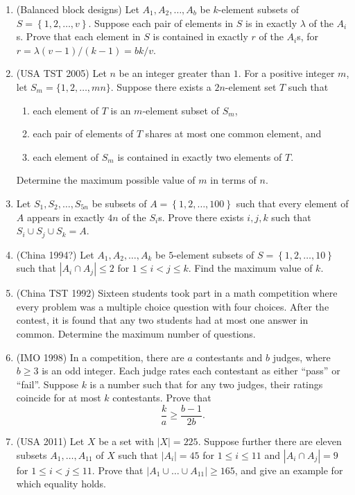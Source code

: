 \documentclass[11pt,paper=letter]{scrartcl}
\begin{document}
\begin{enumerate}

\item (Balanced block designs) Let $A_1, A_2, \ldots, A_b$ be $k$-element subsets of $ S = \left\{ 1, 2, \ldots, v \right\} $. Suppose each pair of elements in $S$ is in exactly $\lambda$ of the $A_i$s. Prove that each element in $S$ is contained in exactly $r$ of the $A_i$s, for $r = \lambda(v-1)/(k-1) = bk/v$. \hint{\ref{h:1}}

\item (USA TST 2005) Let $n$ be an integer greater than $1$. For a positive integer $m$, let $S_m = \{1, 2, \ldots, mn\}$. Suppose there exists a $2n$-element set $T$ such that
\begin{enumerate}
  \item each element of $T$ is an $m$-element subset of $S_m$,
  \item each pair of elements of $T$ shares at most one common element, and
  \item each element of $S_m$ is contained in exactly two elements of $T$.
\end{enumerate}
Determine the maximum possible value of $m$ in terms of $n$. \hint{\ref{h:2}}

\item Let $S_1, S_2, \ldots, S_{5n}$ be subsets of $A = \left\{ 1, 2, \ldots, 100 \right\} $ such that every element of $A$ appears in exactly $4n$ of the $S_i$s. Prove there exists $i, j, k$ such that $S_i \cup S_j \cup S_k = A$.

\item (China 1994?) Let $A_1, A_2, \ldots, A_k$ be $5$-element subsets of $S = \left\{ 1, 2, \ldots, 10 \right\} $ such that $|A_i \cap A_j| \le 2$ for $1 \le i < j \le k$. Find the maximum value of $k$. \hint{\ref{h:3}}

\item (China TST 1992) Sixteen students took part in a math competition where every problem was a multiple choice question with four choices. After the contest, it is found that any two students had at most one answer in common. Determine the maximum number of questions. \hint{\ref{h:3}}

\item (IMO 1998) In a competition, there are $a$ contestants and $b$ judges, where $b \ge 3$ is an odd integer. Each judge rates each contestant as either ``pass'' or ``fail''. Suppose $k$ is a number such that for any two judges, their ratings coincide for at most $k$ contestants. Prove that \[
  \frac{k}{a} \ge \frac{b-1}{2b}.
\]

\item (USA 2011) Let $X$ be a set with $|X| = 225$. Suppose further there are eleven subsets $A_1, \ldots, A_{11}$ of $X$ such that $|A_i| = 45$ for $1 \le i \le 11$ and $|A_i \cap A_j| = 9$ for $1 \le i < j \le 11$. Prove that $|A_1 \cup \dots \cup A_{11}| \ge 165$, and give an example for which equality holds. \hint{\ref{h:2}}

\end{enumerate}
\end{document}
